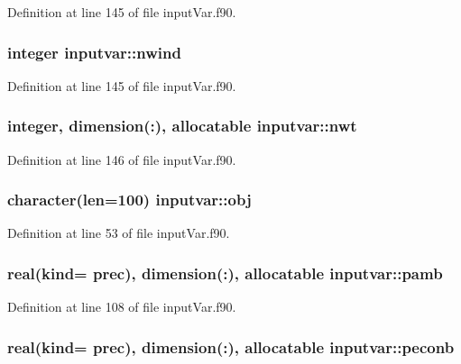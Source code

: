 Definition at line 145 of file input\-Var.\-f90.

\hypertarget{classinputvar_a02de598dd9d979229fdb815b3fbfcd04}{
\subsubsection[{nwind}]{\setlength{\rightskip}{0pt plus 5cm}integer inputvar\-::nwind}}\label{classinputvar_a02de598dd9d979229fdb815b3fbfcd04}


Definition at line 145 of file input\-Var.\-f90.

\hypertarget{classinputvar_a33759b5d3ac0ed8e83e2a56028668bc5}{
\subsubsection[{nwt}]{\setlength{\rightskip}{0pt plus 5cm}integer, dimension(\-:), allocatable inputvar\-::nwt}}\label{classinputvar_a33759b5d3ac0ed8e83e2a56028668bc5}


Definition at line 146 of file input\-Var.\-f90.

\hypertarget{classinputvar_ab5d2f467a214e31204c18a24582b81bb}{
\subsubsection[{obj}]{\setlength{\rightskip}{0pt plus 5cm}character(len=100) inputvar\-::obj}}\label{classinputvar_ab5d2f467a214e31204c18a24582b81bb}


Definition at line 53 of file input\-Var.\-f90.

\hypertarget{classinputvar_a241f8b7a07fdc252022c2ef56cfded42}{
\subsubsection[{pamb}]{\setlength{\rightskip}{0pt plus 5cm}real(kind= prec), dimension(\-:), allocatable inputvar\-::pamb}}\label{classinputvar_a241f8b7a07fdc252022c2ef56cfded42}


Definition at line 108 of file input\-Var.\-f90.

\hypertarget{classinputvar_adfc7efd23b85b75ea9411b9da5e8ccbd}{
\subsubsection[{peconb}]{\setlength{\rightskip}{0pt plus 5cm}real(kind= prec), dimension(\-:), allocatable inputvar\-::peconb}}\label{classinputvar_adfc7efd23b85b75ea9411b9da5e8ccbd}


